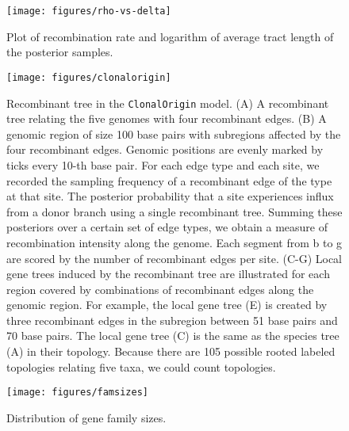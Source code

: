 \documentclass[10pt]{article}
\begin{document}
\begin{figure}
\begin{center}
\texttt{[image: figures/rho-vs-delta]}
\end{center}
\caption{Plot of recombination rate and logarithm of average tract length
of the posterior samples.}
\label{fig:rhologdelta}
\end{figure}
\clearpage{}%

\begin{figure}
\texttt{[image: figures/clonalorigin]}
\caption{\label{fig:clonalorigin}Recombinant tree in the \texttt{ClonalOrigin} model.
(A) A recombinant tree relating the five genomes with four recombinant edges.
(B) A genomic region of size 100 base pairs with subregions affected by the
four recombinant edges. Genomic positions are evenly marked by ticks every 10-th
base pair.  For each edge type and each site, we recorded the sampling frequency
of a recombinant edge of the type at that site.  The posterior probability that
a site experiences influx from a donor branch using a single recombinant tree.
Summing these posteriors over a certain set of edge types, we obtain a measure
of recombination intensity along the genome.  Each segment from b to g are
scored by the number of recombinant edges per site.  (C-G) Local gene trees
induced by the recombinant tree are illustrated for each region covered by
combinations of recombinant edges along the genomic region. For example, the
local gene tree (E) is created by three recombinant edges in the subregion
between 51 base pairs and 70 base pairs. The local gene tree (C) is the same as
the species tree (A) in their topology.  Because there are 105 possible rooted
labeled topologies relating five taxa, we could count topologies.}
\end{figure}
\clearpage{}%

\begin{figure}
\begin{center}
\texttt{[image: figures/famsizes]}
\end{center}
\caption{\label{fig:famsizes}Distribution of gene family sizes.}
\end{figure}
\clearpage{}
\end{document}

